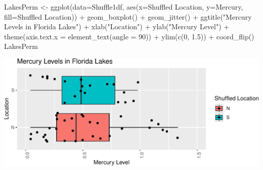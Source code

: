 \documentclass[
  letterpaper,
  DIV=11,
  numbers=noendperiod]{scrreprt}
\newenvironment{Shaded}{\begin{snugshade}}{\end{snugshade}}
\newcommand{\AttributeTok}[1]{\textcolor[rgb]{0.40,0.45,0.13}{#1}}
\newcommand{\DecValTok}[1]{\textcolor[rgb]{0.68,0.00,0.00}{#1}}
\newcommand{\FloatTok}[1]{\textcolor[rgb]{0.68,0.00,0.00}{#1}}
\newcommand{\FunctionTok}[1]{\textcolor[rgb]{0.28,0.35,0.67}{#1}}
\newcommand{\NormalTok}[1]{\textcolor[rgb]{0.00,0.23,0.31}{#1}}
\newcommand{\OtherTok}[1]{\textcolor[rgb]{0.00,0.23,0.31}{#1}}
\newcommand{\SpecialCharTok}[1]{\textcolor[rgb]{0.37,0.37,0.37}{#1}}
\newcommand{\StringTok}[1]{\textcolor[rgb]{0.13,0.47,0.30}{#1}}
\begin{document}
\begin{Shaded}
\end{Shaded}

\begin{Shaded}
\begin{Highlighting}[]
\NormalTok{LakesPerm }\OtherTok{\textless{}{-}} \FunctionTok{ggplot}\NormalTok{(}\AttributeTok{data=}\NormalTok{Shuffle1df, }\FunctionTok{aes}\NormalTok{(}\AttributeTok{x=}\StringTok{\textasciigrave{}}\AttributeTok{Shuffled Location}\StringTok{\textasciigrave{}}\NormalTok{, }\AttributeTok{y=}\NormalTok{Mercury, }\AttributeTok{fill=}\StringTok{\textasciigrave{}}\AttributeTok{Shuffled Location}\StringTok{\textasciigrave{}}\NormalTok{)) }\SpecialCharTok{+} 
  \FunctionTok{geom\_boxplot}\NormalTok{() }\SpecialCharTok{+}   \FunctionTok{geom\_jitter}\NormalTok{() }\SpecialCharTok{+} \FunctionTok{ggtitle}\NormalTok{(}\StringTok{"Mercury Levels in Florida Lakes"}\NormalTok{) }\SpecialCharTok{+} 
  \FunctionTok{xlab}\NormalTok{(}\StringTok{"Location"}\NormalTok{) }\SpecialCharTok{+} \FunctionTok{ylab}\NormalTok{(}\StringTok{"Mercury Level"}\NormalTok{) }\SpecialCharTok{+} \FunctionTok{theme}\NormalTok{(}\AttributeTok{axis.text.x =} \FunctionTok{element\_text}\NormalTok{(}\AttributeTok{angle =} \DecValTok{90}\NormalTok{)) }\SpecialCharTok{+} \FunctionTok{ylim}\NormalTok{(}\FunctionTok{c}\NormalTok{(}\DecValTok{0}\NormalTok{, }\FloatTok{1.5}\NormalTok{)) }\SpecialCharTok{+} \FunctionTok{coord\_flip}\NormalTok{()}
\NormalTok{LakesPerm}
\end{Highlighting}
\end{Shaded}

\includegraphics{Ch3_files/figure-pdf/unnamed-chunk-195-1.pdf}
\end{document}
